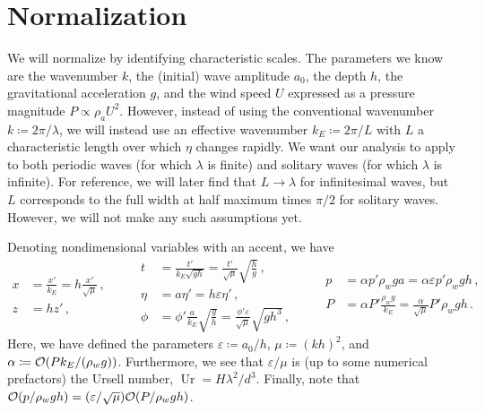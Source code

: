 \documentclass{jfm}
\DeclareMathOperator{\Ur}{Ur}
\renewcommand*{\epsilon}{\varepsilon}
\begin{document}
\section{Normalization}
We will normalize by identifying characteristic scales.
The parameters we know \apriori are the wavenumber $k$, the (initial)
wave amplitude $a_0$, the depth $h$, the gravitational acceleration $g$,
and the wind speed $U$ expressed as a pressure magnitude $P \propto
\rho_a U^2$.
However, instead of using the conventional wavenumber $k \coloneqq 2 \pi
/ \lambda$, we will instead use an effective wavenumber $k_E \coloneqq 2
\pi/ L$ with $L$ a characteristic length over which $\eta$ changes
rapidly.
We want our analysis to apply to both periodic waves (for which
$\lambda$ is finite) and solitary waves (for which $\lambda$ is
infinite).
For reference, we will later find that $L \to \lambda$ for infinitesimal
waves, but $L$ corresponds to the full width at half maximum times $\pi/2$ for solitary
waves.
However, we will not make any such assumptions yet.

Denoting nondimensional variables with an accent, we have
\begin{equation*}
  \begin{aligned}
  x &= \frac{x'}{k_E} = h \frac{x'}{\sqrt{\mu}}\,, \\
  z &= h z' \,,
  \end{aligned}
  \qquad
  \begin{aligned}
  t &= \frac{t'}{k_E\sqrt{g h}}
    = \frac{t'}{\sqrt{\mu}} \sqrt{\frac{h}{g}} \,, \\
  \eta &= a \eta' = h \epsilon \eta' \,, \\
  \phi &= \phi'\frac{a}{k_E}\sqrt{\frac{g}{h}}
    = \frac{\phi'\epsilon}{\sqrt{\mu}}\sqrt{g h^3} \,,
  \end{aligned}
  \qquad
  \begin{aligned}
  p &= \alpha p' \rho_w g a
    = \alpha \epsilon p' \rho_w g h \,, \\
  P &= \alpha P' \frac{\rho_w g}{k_E}
    = \frac{\alpha}{\sqrt{\mu}} P' \rho_w g h \,.
  \end{aligned}
\end{equation*}
Here, we have defined the parameters $\epsilon \coloneqq a_0/h$, $\mu
\coloneqq (kh)^2$, and $\alpha \coloneqq \order{P k_E/(\rho_w g
)}$.
Furthermore, we see that $\epsilon/\mu$ is (up to some numerical
prefactors) the Ursell number, $\Ur = H \lambda^2/d^3$.
Finally, note that $\order{p/\rho_w g h} = (\epsilon/\sqrt{\mu})
\order{P/\rho_w g h}$.
\end{document}
